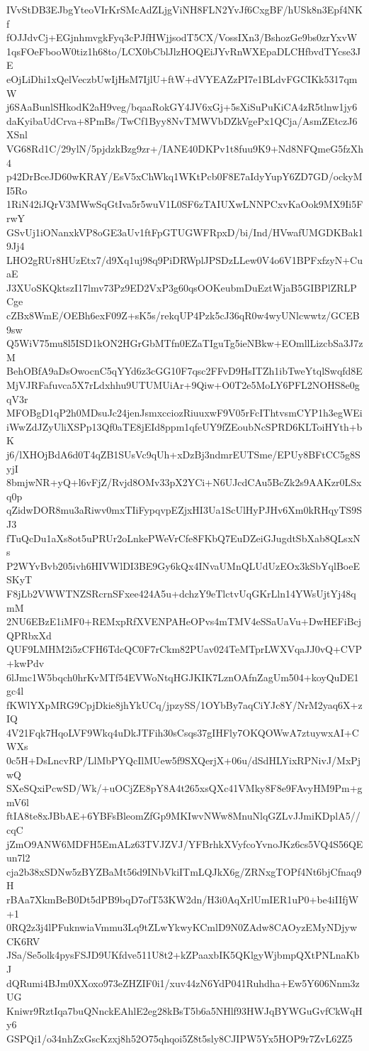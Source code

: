 IVvStDB3EJbgYteoVIrKrSMcAdZLjgViNH8FLN2YvJf6CxgBF/hUSk8n3Epf4NKf
fOJJdvCj+EGjnhmvgkFyq3cPJfHWjjsodT5CX/VossIXn3/BshozGe9bs0zrYxvW
1qsFOeFbooW0tiz1h68to/LCX0bCblJlzHOQEiJYvRnWXEpaDLCHfbvdTYcse3JE
eOjLiDhi1xQelVeczbUwIjHsM7IjlU+ftW+dVYEAZzPI7e1BLdvFGCIKk5317qmW
j6SAaBunlSHkodK2aH9veg/bqaaRokGY4JV6xGj+5sXiSuPuKiCA4zR5tlnw1jy6
daKyibaUdCrva+8PmBs/TwCf1Byy8NvTMWVbDZkVgePx1QCja/AsmZEtczJ6XSnl
VG68Rd1C/29ylN/5pjdzkBzg9zr+/IANE40DKPv1t8fuu9K9+Nd8NFQmeG5fzXh4
p42DrBceJD60wKRAY/EsV5xChWkq1WKtPcb0F8E7aIdyYupY6ZD7GD/ockyMI5Ro
1RiN42iJQrV3MWwSqGtIva5r5wuV1L0SF6zTAIUXwLNNPCxvKaOok9MX9Ii5FrwY
GSvUj1iONanxkVP8oGE3aUv1ftFpGTUGWFRpxD/bi/Ind/HVwafUMGDKBak19Jj4
LHO2gRUr8HUzEtx7/d9Xq1uj98q9PiDRWplJPSDzLLew0V4o6V1BPFxfzyN+CuaE
J3XUoSKQktszI17lmv73Pz9ED2VxP3g60qsOOKeubmDuEztWjaB5GIBPlZRLPCge
cZBx8WmE/OEBh6exF09Z+sK5s/rekqUP4Pzk5cJ36qR0w4wyUNlcwwtz/GCEB9sw
Q5WiV75mu8l5ISD1kON2HGrGbMTfn0EZaTIguTg5ieNBkw+EOmllLizcbSa3J7zM
BehOBfA9aDsOwocnC5qYYd6z3cGG10F7qsc2FFvD9HsITZh1ibTweYtqlSwqfd8E
MjVJRFafuvca5X7rLdxhhu9UTUMUiAr+9Qiw+O0T2e5MoLY6PFL2NOHS8e0gqV3r
MFOBgD1qP2h0MDsuJc24jenJsmxcciozRiuuxwF9V05rFcIThtvsmCYP1h3egWEi
iWwZdJZyUliXSPp13Qf0aTE8jEId8ppm1qfeUY9fZEoubNcSPRD6KLToiHYth+bK
j6/lXHOjBdA6d0T4qZB1SUsVc9qUh+xDzBj3ndmrEUTSme/EPUy8BFtCC5g8SyjI
8bmjwNR+yQ+l6vFjZ/Rvjd8OMv33pX2YCi+N6UJcdCAu5BcZk2s9AAKzr0LSxq0p
qZidwDOR8mu3aRiwv0mxTIiFypqvpEZjxHI3Ua1ScUlHyPJHv6Xm0kRHqyTS9SJ3
fTuQcDu1aXs8ot5uPRUr2oLnkePWeVrCfe8FKbQ7EuDZeiGJugdtSbXab8QLsxNs
P2WYvBvb205ivh6HIVWlDI3BE9Gy6kQx4INvaUMnQLUdUzEOx3kSbYqlBoeESKyT
F8jLb2VWWTNZSRcrnSFxee424A5u+dchzY9eTlctvUqGKrLln14YWsUjtYj48qmM
2NU6EBzE1iMF0+REMxpRfXVENPAHeOPvs4mTMV4eSSaUaVu+DwHEFiBcjQPRbxXd
QUF9LMHM2i5zCFH6TdcQC0F7rCkm82PUav024TeMTprLWXVqaJJ0vQ+CVP+kwPdv
6lJmc1W5bqch0hrKvMTf54EVWoNtqHGJKIK7LznOAfnZagUm504+koyQuDE1gc4l
fKWlYXpMRG9CpjDkie8jhYkUCq/jpzySS/1OYbBy7aqCiYJc8Y/NrM2yaq6X+zIQ
4V21Fqk7HqoLVF9Wkq4uDkJTFih30sCsqs37gIHFly7OKQOWwA7ztuywxAI+CWXs
0c5H+DsLncvRP/LlMbPYQcIlMUew5f9SXQerjX+06u/dSdHLYixRPNivJ/MxPjwQ
SXeSQxiPcwSD/Wk/+uOCjZE8pY8A4t265xsQXc41VMky8F8e9FAvyHM9Pm+gmV6l
ftIA8te8xJBbAE+6YBFsBleomZfGp9MKIwvNWw8MnuNlqGZLvJJmiKDplA5//cqC
jZmO9ANW6MDFH5EmALz63TVJZVJ/YFBrhkXVyfcoYvnoJKz6cs5VQ4S56QEun7l2
cja2b38xSDNw5zBYZBaMt56d9INbVkiITmLQJkX6g/ZRNxgTOPf4Nt6bjCfnaq9H
rBAa7XkmBeB0Dt5dPB9bqD7ofT53KW2dn/H3i0AqXrlUmIER1uP0+be4iIIfjW+1
0RQ2z3j4lPFuknwiaVmmu3Lq9tZLwYkwyKCmlD9N0ZAdw8CAOyzEMyNDjywCK6RV
JSa/Se5olk4pysFSJD9UKfdve511U8t2+kZPaaxbIK5QKlgyWjbmpQXtPNLnaKbJ
dQRumi4BJm0XXoxo973eZHZIF0i1/xuv44zN6YdP041Ruhdha+Ew5Y606Nnm3zUG
Kniwr9RztIqa7buQNnckEAhlE2eg28kBsT5b6a5NHlf93HWJqBYWGuGvfCkWqHy6
GSPQi1/o34nhZxGscKzxj8h52O75qhqoi5Z8t5sly8CJIPW5Yx5HOP9r7ZvL62Z5
